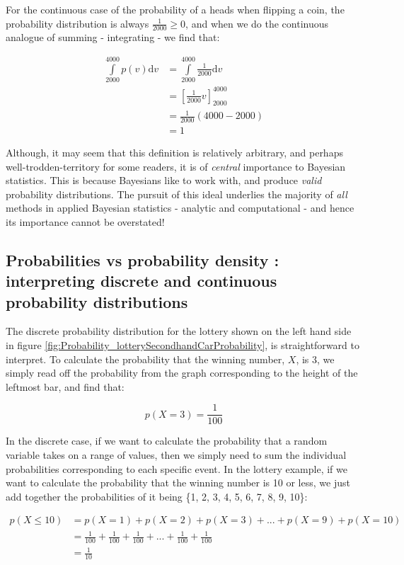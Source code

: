 \documentclass[11pt,fullpage]{book}
\begin{document}
For the continuous case of the probability of a heads when flipping a coin, the probability distribution is always $\frac{1}{2000}\geq 0$, and when we do the continuous analogue of summing - integrating - we find that:

\begin{align}
\int\limits_{2000}^{4000} p(v) \mathrm{d}v &= \int\limits_{2000}^{4000} \frac{1}{2000} \mathrm{d}v\\
&= \left[\frac{1}{2000}v\right]^{4000}_{2000}\\
&= \frac{1}{2000}\left(4000-2000\right)\\
&= 1
\end{align}

Although, it may seem that this definition is relatively arbitrary, and perhaps well-trodden-territory for some readers, it is of \textit{central} importance to Bayesian statistics. This is because Bayesians like to work with, and produce \textit{valid} probability distributions. The pursuit of this ideal underlies the majority of \textit{all} methods in applied Bayesian statistics - analytic and computational - and hence its importance cannot be overstated!

\subsection{Probabilities vs probability density : interpreting discrete and continuous probability distributions}\label{sec:Probability_densityVsMassFunctions}
The discrete probability distribution for the lottery shown on the left hand side in figure \ref{fig:Probability_lotterySecondhandCarProbability}, is straightforward to interpret. To calculate the probability that the winning number, $X$, is 3, we simply read off the probability from the graph corresponding to the height of the leftmost bar, and find that:

\begin{equation}
p(X=3)= \frac{1}{100}
\end{equation}

In the discrete case, if we want to calculate the probability that a random variable takes on a range of values, then we simply need to sum the individual probabilities corresponding to each specific event. In the lottery example, if we want to calculate the probability that the winning number is 10 or less, we just add together the probabilities of it being \{1, 2, 3, 4, 5, 6, 7, 8, 9, 10\}:

\begin{align}
p(X\leq 10) &= p(X=1) + p(X=2) + p(X=3) + ... + p(X=9) + p(X=10)\\
&= \frac{1}{100} + \frac{1}{100} + \frac{1}{100} + ... + \frac{1}{100} + \frac{1}{100}\\
&= \frac{1}{10}
\end{align}
\end{document}
